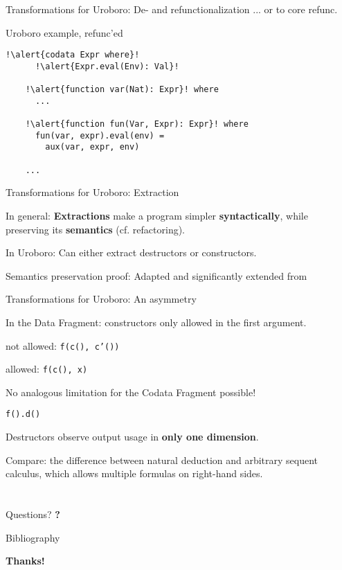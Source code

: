 \documentclass[xcolor=svgnames]{beamer}
\begin{document}
\begin{frame}[fragile]
  {Transformations for Uroboro: De- and refunctionalization}
... or to core refunc.

  \begin{block}{Uroboro example, refunc'ed}
    \begin{lstlisting}[escapechar=!]
    !\alert{codata Expr where}!
      !\alert{Expr.eval(Env): Val}!

    !\alert{function var(Nat): Expr}! where
      ...

    !\alert{function fun(Var, Expr): Expr}! where     
      fun(var, expr).eval(env) =
        aux(var, expr, env)

    ...
    \end{lstlisting}
  \end{block}
\end{frame}


\begin{frame}
  {Transformations for Uroboro: Extraction}

  In general: \textbf{Extractions} make a program simpler \textbf{syntactically}, while preserving its \textbf{semantics} (cf. refactoring).

  In Uroboro: Can either extract destructors or constructors.

  Semantics preservation proof: Adapted and significantly extended from \citet{setzer14unnesting}

\end{frame}


\begin{frame}
  {Transformations for Uroboro: An asymmetry}

  In the Data Fragment: constructors only allowed in the first argument.

  not allowed: \texttt{f(c(), c'())}

  allowed: \texttt{f(c(), x)}

  No analogous limitation for the Codata Fragment possible!

  \texttt{f().d()}

  Destructors observe output usage in \textbf{only one dimension}.

  Compare: the difference between natural deduction and arbitrary sequent calculus, which allows multiple formulas on right-hand sides.
\end{frame}

\section*{}

\begin{frame}
  {Questions?}
  \centering\Huge\textbf?
\end{frame}

\begin{frame}%
  {Bibliography}
  
  \tiny
\end{frame}

\begin{frame}
  \centering\Huge\textbf{Thanks!}
\end{frame}
\end{document}

